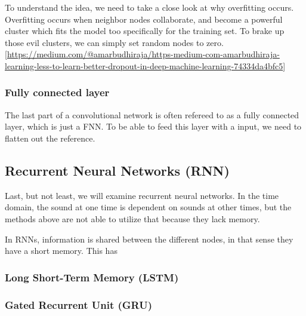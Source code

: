 To understand the idea, we need to take a close look at why overfitting occurs. Overfitting occurs when neighbor nodes collaborate, and become a powerful cluster which fits the model too specifically for the training set. To brake up those evil clusters, we can simply set random nodes to zero. [\url{https://medium.com/@amarbudhiraja/https-medium-com-amarbudhiraja-learning-less-to-learn-better-dropout-in-deep-machine-learning-74334da4bfc5}]

\subsubsection*{Fully connected layer}
The last part of a convolutional network is often refereed to as a fully connected layer, which is just a FNN. To be able to feed this layer with a input, we need to flatten out the reference. 

\subsection{Recurrent Neural Networks (RNN)}
Last, but not least, we will examine recurrent neural networks. In the time domain, the sound at one time is dependent on sounds at other times, but the methods above are not able to utilize that because they lack memory. 

In RNNs, information is shared between the different nodes, in that sense they have a short memory. This has 

\subsubsection*{Long Short-Term Memory (LSTM)}


\subsubsection*{Gated Recurrent Unit (GRU)}

